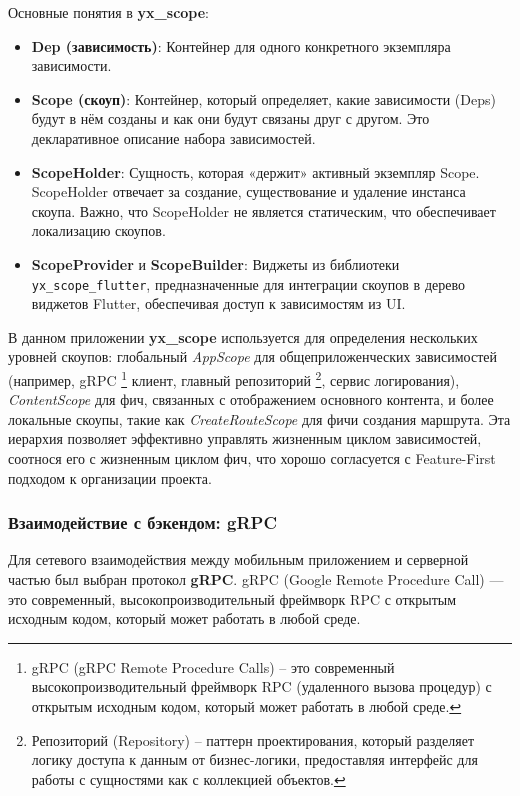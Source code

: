 Основные понятия в \textbf{yx\_scope}:
\begin{itemize}
    \item \textbf{Dep (зависимость)}: Контейнер для одного конкретного экземпляра зависимости.
    \item \textbf{Scope (скоуп)}: Контейнер, который определяет, какие зависимости (Deps) будут в нём созданы и как они будут связаны друг с другом. Это декларативное описание набора зависимостей.
    \item \textbf{ScopeHolder}: Сущность, которая «держит» активный экземпляр Scope. ScopeHolder отвечает за создание, существование и удаление инстанса скоупа. Важно, что ScopeHolder не является статическим, что обеспечивает локализацию скоупов.
    \item \textbf{ScopeProvider} и \textbf{ScopeBuilder}: Виджеты из библиотеки \texttt{yx\_scope\_flutter}, предназначенные для интеграции скоупов в дерево виджетов Flutter, обеспечивая доступ к зависимостям из UI.
\end{itemize}

В данном приложении \textbf{yx\_scope} используется для определения нескольких уровней скоупов: глобальный \textit{AppScope} для общеприложенческих зависимостей (например, gRPC \footnote{gRPC (gRPC Remote Procedure Calls) – это современный высокопроизводительный фреймворк RPC (удаленного вызова процедур) с открытым исходным кодом, который может работать в любой среде.} клиент, главный репозиторий \footnote{Репозиторий (Repository) – паттерн проектирования, который разделяет логику доступа к данным от бизнес-логики, предоставляя интерфейс для работы с сущностями как с коллекцией объектов.}, сервис логирования), \textit{ContentScope} для фич, связанных с отображением основного контента, и более локальные скоупы, такие как \textit{CreateRouteScope} для фичи создания маршрута. Эта иерархия позволяет эффективно управлять жизненным циклом зависимостей, соотнося его с жизненным циклом фич, что хорошо согласуется с Feature-First подходом к организации проекта.



\subsubsection*{Взаимодействие с бэкендом: gRPC}
Для сетевого взаимодействия между мобильным приложением и серверной частью был выбран протокол \textbf{gRPC}. gRPC (Google Remote Procedure Call) — это современный, высокопроизводительный фреймворк RPC с открытым исходным кодом, который может работать в любой среде.

